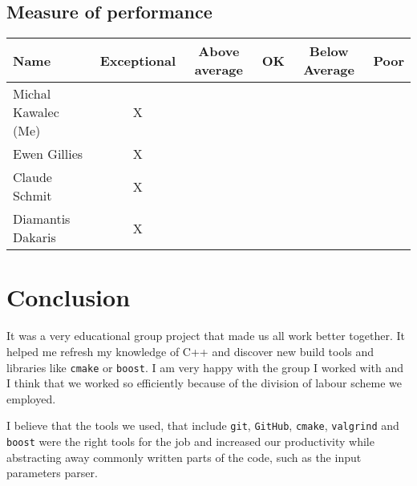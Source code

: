 \documentclass[11pt,a4paper]{article}
\begin{document}
\subsection{Measure of performance}
\begin{tabular}{|l||c|c|c|c|c|}
    \hline
    Name & Exceptional & Above average & OK & Below Average & Poor \\
    \hline \hline
    Michal Kawalec (Me)& X & & & & \\
    \hline
    Ewen Gillies & X & & & & \\
    \hline 
    Claude Schmit & X & & & & \\ 
    \hline
    Diamantis Dakaris & X & & & & \\
    \hline
\end{tabular}

\section{Conclusion}
It was a very educational group project that made us all work better together. It helped me refresh my knowledge of C++ and discover new build tools and libraries like \texttt{cmake} or \texttt{boost}. I am very happy with the group I worked with and I think that we worked so efficiently because of the division of labour scheme we employed.

I believe that the tools we used, that include \texttt{git}, \texttt{GitHub}, \texttt{cmake}, \texttt{valgrind} and \texttt{boost} were the right tools for the job and increased our productivity while abstracting away commonly written parts of the code, such as the input parameters parser.
\end{document}
